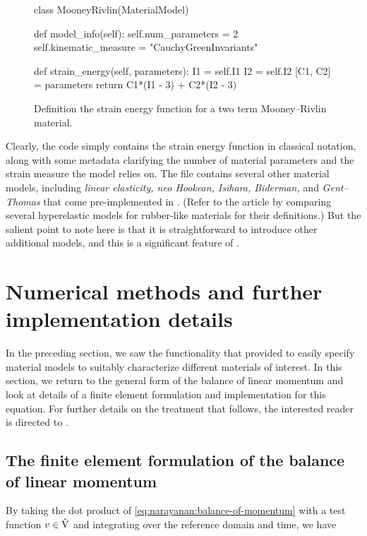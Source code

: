 \begin{figure}[!ht]
\begin{python}
class MooneyRivlin(MaterialModel)

  def model_info(self):
    self.num_parameters = 2
    self.kinematic_measure = "CauchyGreenInvariants"

  def strain_energy(self, parameters):
    I1 = self.I1
    I2 = self.I2
    [C1, C2] = parameters
    return C1*(I1 - 3) + C2*(I2 - 3)
\end{python}
\caption{Definition the strain energy function for a two term
  Mooney--Rivlin material.}
\label{code:narayanan:mr}
\end{figure}

\noindent Clearly, the code simply contains the strain energy function
in classical notation, along with some metadata clarifying the number
of material parameters and the strain measure the model relies on. The
file  contains several other material models,
including {\em linear elasticity, neo Hookean, Isihara, Biderman,} and
{\em Gent--Thomas} that come pre-implemented in \twist. (Refer to the
article by \citet{MarckmannVerron2006} comparing several hyperelastic
models for rubber-like materials for their definitions.) But the
salient point to note here is that it is straightforward to introduce
other additional models, and this is a significant feature of \twist.

\section{Numerical methods and further implementation details}

In the preceding section, we saw the functionality that \twist{}
provided to easily specify material models to suitably characterize
different materials of interest. In this section, we return to the
general form of the balance of linear momentum and look at details of
a finite element formulation and implementation for this equation. For
further details on the treatment that follows, the interested reader
is directed to \citet{SimoHughes1998}.

\subsection{The finite element formulation of the balance of linear
  momentum}

By taking the dot product of
\eqref{eq:narayanan:balance-of-momentum} with a test function
$\mbox{$ v$} \in \hat{\mathrm{V}}$ and integrating over the reference domain
and time, we have

